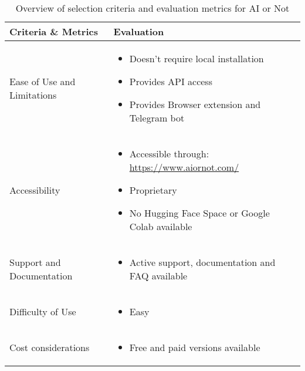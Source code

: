 \begin{table}[htpb]
	\caption{Overview of selection criteria and evaluation metrics for AI or Not}\label{tab:ai-or-not-overview}
	\centering
	\small
	\begin{tabularx}{\textwidth}{l X}
		\toprule
		\textbf{Criteria \& Metrics} & \textbf{Evaluation}                                                   \\
		\midrule
		Ease of Use and Limitations  & \begin{itemize}
			                               \item Doesn't require local installation
			                               \item Provides \ac{API} access
			                               \item Provides Browser extension and Telegram bot
		                               \end{itemize}                      \\
		\addlinespace
		Accessibility                & \begin{itemize}
			                               \item Accessible through: \url{https://www.aiornot.com/}
			                               \item Proprietary
			                               \item No Hugging Face Space or Google Colab available
		                               \end{itemize}               \\
		\addlinespace
		Support and Documentation    & \begin{itemize}
			                               \item Active support, documentation and FAQ available
		                               \end{itemize}                  \\
		\addlinespace
		Difficulty of Use            & \begin{itemize}
			                               \item Easy
		                               \end{itemize}                                                        \\
		\addlinespace
		Cost considerations          & \begin{itemize}
			                               \item Free and paid versions available
		                               \end{itemize}                                 \\

\end{tabularx}
\end{table}
